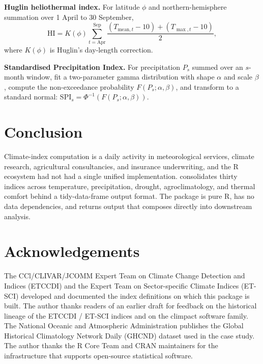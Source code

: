\textbf{Huglin heliothermal index.} For latitude \(\phi\) and
northern-hemisphere summation over 1 April to 30 September,
\[\mathrm{HI} = K(\phi) \sum_{t = \mathrm{Apr}}^{\mathrm{Sep}}
\frac{(T_{\mathrm{mean},t} - 10) + (T_{\max,t} - 10)}{2},\]
where \(K(\phi)\) is Huglin's day-length correction.

\textbf{Standardised Precipitation Index.} For precipitation \(P_s\)
summed over an \(s\)-month window, fit a two-parameter gamma
distribution with shape \(\alpha\) and scale \(\beta\), compute the
non-exceedance probability \(F(P_s; \alpha, \beta)\), and transform
to a standard normal: \(\mathrm{SPI}_s = \Phi^{-1}(F(P_s; \alpha, \beta))\).

\section{Conclusion}\label{conclusion}

Climate-index computation is a daily activity in meteorological
services, climate research, agricultural consultancies, and
insurance underwriting, and the R ecosystem had not had a single
unified implementation.  consolidates thirty
indices across temperature, precipitation, drought, agroclimatology,
and thermal comfort behind a tidy-data-frame output format. The
package is pure R, has no data dependencies, and returns output
that composes directly into downstream analysis.

\section*{Acknowledgements}\label{acknowledgements}

The CCl/CLIVAR/JCOMM Expert Team on Climate Change Detection and
Indices (ETCCDI) and the Expert Team on Sector-specific Climate
Indices (ET-SCI) developed and documented the index definitions on
which this package is built. The author thanks readers of an
earlier draft for feedback on the historical lineage of the
ETCCDI / ET-SCI indices and on the climpact software family. The
National Oceanic and Atmospheric Administration publishes the
Global Historical Climatology Network Daily (GHCND) dataset used
in the case study. The author thanks the R Core Team and CRAN
maintainers for the infrastructure that supports open-source
statistical software.



\address{%
Charles Coverdale\\
Independent\\%
London, United Kingdom\\
%
\url{https://github.com/charlescoverdale/climatekit}\\%
%
\href{mailto:charles.f.coverdale@gmail.com}{\nolinkurl{charles.f.coverdale@gmail.com}}%
}
